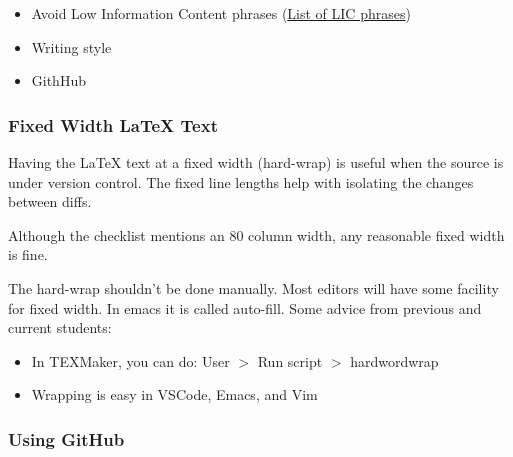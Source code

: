 \documentclass[12pt]{article}
\begin{document}
\begin{itemize}
\item Avoid Low Information Content phrases 
    (\href{https://www.webpages.uidaho.edu/range357/extra-refs/empty-words.htm}{List
      of LIC phrases})


\item Writing style
  
\item GithHub

\end{itemize}

\subsubsection*{Fixed Width \LaTeX{} Text}

Having the \LaTeX{} text at a fixed width (hard-wrap) is useful when the source
is under version control.  The fixed line lengths help with isolating the
changes between diffs.

Although the checklist mentions an 80 column width, any reasonable fixed width
is fine.

The hard-wrap shouldn't be done manually.  Most editors will have some facility
for fixed width.  In emacs it is called auto-fill.  Some advice from previous
and current students:

\begin{itemize}
\item In TEXMaker, you can do: User $>$ Run script $>$ hardwordwrap
\item Wrapping is easy in VSCode, Emacs, and Vim
\end{itemize}

\subsubsection*{Using GitHub}
\end{document}
